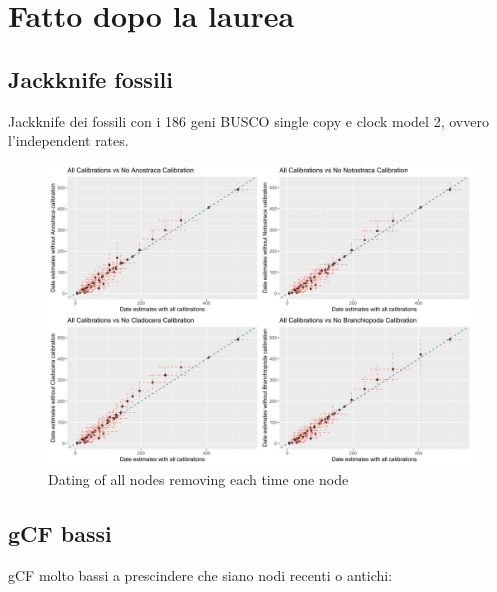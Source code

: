 \section{Fatto dopo la laurea}
\subsection{Jackknife fossili}
Jackknife dei fossili con i 186 geni BUSCO single copy e clock model 2, ovvero l'independent rates.

\begin{figure}[h!]
    \centering
    \includegraphics[width=1\textwidth]{Figures/Jackknife_scatterplot.png}
    \caption[Fossil Jackknife]{Dating of all nodes removing each time one node
}
    \label{fig:lsd2tree}
\end{figure}

\pagebreak
\subsection{gCF bassi}
gCF molto bassi a prescindere che siano nodi recenti o antichi:

